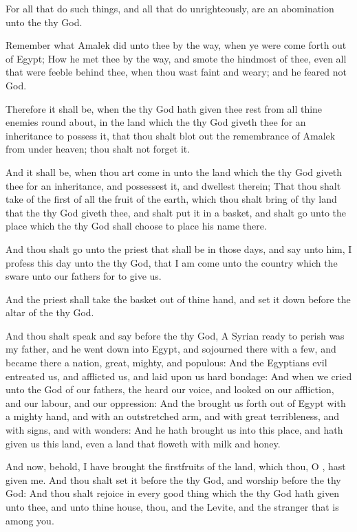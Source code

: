 \Verse For all that do such things, and all that do unrighteously, are an abomination unto the \LORD thy God.

\Verse Remember what Amalek did unto thee by the way, when ye were come forth out of Egypt; \Verse How he met thee by the way, and smote the hindmost of thee, even all that were feeble behind thee, when thou wast faint and weary; and he feared not God.

\Verse Therefore it shall be, when the \LORD thy God hath given thee rest from all thine enemies round about, in the land which the \LORD thy God giveth thee for an inheritance to possess it, that thou shalt blot out the remembrance of Amalek from under heaven; thou shalt not forget it.


\Chapter
\Verse And it shall be, when thou art come in unto the land which the \LORD thy God giveth thee for an inheritance, and possessest it, and dwellest therein; \Verse That thou shalt take of the first of all the fruit of the earth, which thou shalt bring of thy land that the \LORD thy God giveth thee, and shalt put it in a basket, and shalt go unto the place which the \LORD thy God shall choose to place his name there.

\Verse And thou shalt go unto the priest that shall be in those days, and say unto him, I profess this day unto the \LORD thy God, that I am come unto the country which the \LORD sware unto our fathers for to give us.

\Verse And the priest shall take the basket out of thine hand, and set it down before the altar of the \LORD thy God.

\Verse And thou shalt speak and say before the \LORD thy God, A Syrian ready to perish was my father, and he went down into Egypt, and sojourned there with a few, and became there a nation, great, mighty, and populous: \Verse And the Egyptians evil entreated us, and afflicted us, and laid upon us hard bondage: \Verse And when we cried unto the \LORD God of our fathers, the \LORD heard our voice, and looked on our affliction, and our labour, and our oppression: \Verse And the \LORD brought us forth out of Egypt with a mighty hand, and with an outstretched arm, and with great terribleness, and with signs, and with wonders: \Verse And he hath brought us into this place, and hath given us this land, even a land that floweth with milk and honey.

\Verse And now, behold, I have brought the firstfruits of the land, which thou, O \LORD, hast given me. And thou shalt set it before the \LORD thy God, and worship before the \LORD thy God: \Verse And thou shalt rejoice in every good thing which the \LORD thy God hath given unto thee, and unto thine house, thou, and the Levite, and the stranger that is among you.

